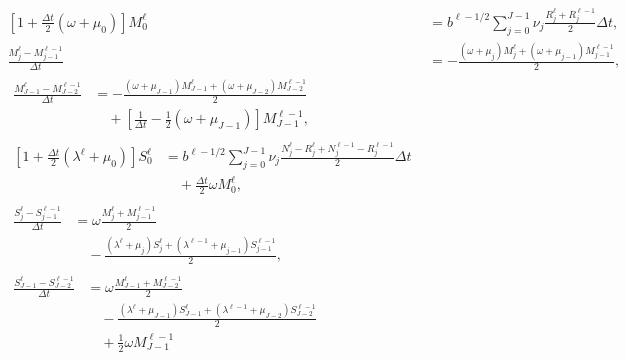 \documentclass{jpmarticle}
\let\subequationsorig\subequations%
\let\endsubequationsorig\endsubequations%
\renewenvironment{subequations}{
  \subequationsorig
  \renewcommand{\theequation}{\theparentequation.\arabic{equation}}
}{
  \endsubequationsorig
}
\begin{document}
\begin{subequations}
  \label{numerics_age_structured}
  \begin{align}
    \left[1 + \frac{\Delta t}{2} (\omega + \mu_0)\right]
    M_0^{\ell}
    &= b^{\ell - 1 / 2}
    \sum_{j = 0}^{J - 1} \nu_j \frac{R_j^{\ell} + R_j^{\ell - 1}}{2}
    \Delta t,
    \\
    \frac{M_j^{\ell} - M_{j - 1}^{\ell - 1}}{\Delta t} &=
    - \frac{(\omega + \mu_j) M_j^{\ell}
      + (\omega + \mu_{j - 1}) M_{j - 1}^{\ell - 1}}{2},
    \\
    \begin{split}
      \frac{M_{J - 1}^{\ell} - M_{J - 2}^{\ell - 1}}{\Delta t} &=
      - \frac{(\omega + \mu_{J - 1}) M_{J - 1}^{\ell}
        + (\omega + \mu_{J - 2}) M_{J - 2}^{\ell - 1}}{2}
      \\ & \quad {}
      + \left[
        \frac{1}{\Delta t} - \frac{1}{2} (\omega + \mu_{J - 1})
      \right] M_{J - 1}^{\ell - 1},
    \end{split}
    \\
    \begin{split}
      \left[1 + \frac{\Delta t}{2} (\lambda^{\ell} + \mu_0)\right] S_0^{\ell}
      &= b^{\ell - 1 / 2}
      \sum_{j = 0}^{J - 1}
      \nu_j
      \frac{N_j^{\ell} - R_j^{\ell} + N_j^{\ell - 1} - R_j^{\ell - 1}}{2}
      \Delta t
      \\ & \quad {}
      + \frac{\Delta t}{2} \omega M_0^{\ell},
    \end{split}
    \\
    \begin{split}
      \frac{S_j^{\ell} - S_{j - 1}^{\ell - 1}}{\Delta t} &=
      \omega \frac{M_j^{\ell} + M_{j - 1}^{\ell - 1}}{2}
      \\ & \quad {}
      - \frac{(\lambda^{\ell} + \mu_j) S_j^{\ell}
        + (\lambda^{\ell - 1} + \mu_{j - 1}) S_{j - 1}^{\ell - 1}}{2},
    \end{split}
    \\
    \begin{split}
      \frac{S_{J - 1}^{\ell} - S_{J - 2}^{\ell - 1}}{\Delta t} &=
      \omega \frac{M_{J - 1}^{\ell} + M_{J - 2}^{\ell - 1}}{2}
      \\ & \quad {}
      - \frac{(\lambda^{\ell} + \mu_{J - 1}) S_{J - 1}^{\ell}
        + (\lambda^{\ell - 1} + \mu_{J - 2}) S_{J - 2}^{\ell - 1}}
      {2}
      \\ & \quad {}
      + \frac{1}{2} \omega M_{J - 1}^{\ell - 1}
      \\ & \quad {}

\end{split}
\end{align}
\end{subequations}
\end{document}

